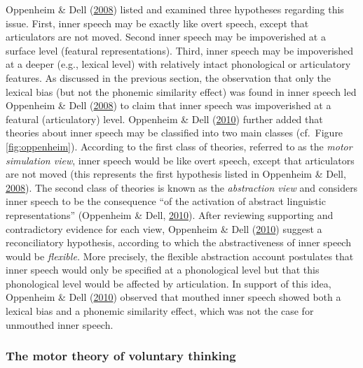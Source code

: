 \documentclass[a4paper,12pt,twoside,onecolumn,openright,final,oldfontcommands]{memoir}
\begin{document}
Oppenheim \& Dell (\protect\hyperlink{ref-oppenheim_inner_2008}{2008}) listed and examined three hypotheses regarding this issue. First, inner speech may be exactly like overt speech, except that articulators are not moved. Second inner speech may be impoverished at a surface level (featural representations). Third, inner speech may be impoverished at a deeper (e.g., lexical level) with relatively intact phonological or articulatory features. As discussed in the previous section, the observation that only the lexical bias (but not the phonemic similarity effect) was found in inner speech led Oppenheim \& Dell (\protect\hyperlink{ref-oppenheim_inner_2008}{2008}) to claim that inner speech was impoverished at a featural (articulatory) level. Oppenheim \& Dell (\protect\hyperlink{ref-oppenheim_motor_2010}{2010}) further added that theories about inner speech may be classified into two main classes (cf.~Figure \ref{fig:oppenheim}). According to the first class of theories, referred to as the \emph{motor simulation view}, inner speech would be like overt speech, except that articulators are not moved (this represents the first hypothesis listed in Oppenheim \& Dell, \protect\hyperlink{ref-oppenheim_inner_2008}{2008}). The second class of theories is known as the \emph{abstraction view} and considers inner speech to be the consequence \enquote{of the activation of abstract linguistic representations} (Oppenheim \& Dell, \protect\hyperlink{ref-oppenheim_motor_2010}{2010}). After reviewing supporting and contradictory evidence for each view, Oppenheim \& Dell (\protect\hyperlink{ref-oppenheim_motor_2010}{2010}) suggest a reconciliatory hypothesis, according to which the abstractiveness of inner speech would be \emph{flexible.} More precisely, the flexible abstraction account postulates that inner speech would only be specified at a phonological level but that this phonological level would be affected by articulation. In support of this idea, Oppenheim \& Dell (\protect\hyperlink{ref-oppenheim_motor_2010}{2010}) observed that mouthed inner speech showed both a lexical bias and a phonemic similarity effect, which was not the case for unmouthed inner speech.

\hypertarget{the-motor-theory-of-voluntary-thinking}{%
\subsubsection{The motor theory of voluntary thinking}\label{the-motor-theory-of-voluntary-thinking}}
\end{document}

